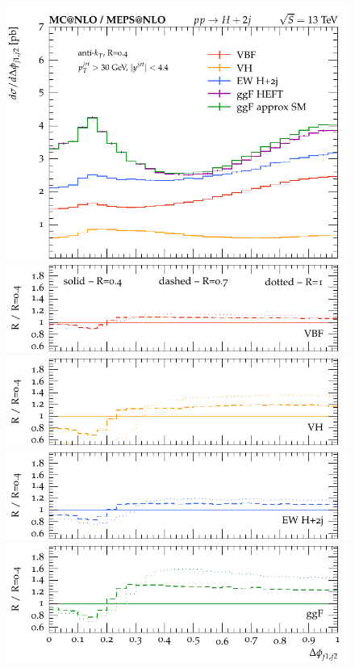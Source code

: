 \documentclass[10pt,prd,fleqn,superscriptaddress,notitlepage,nofootinbib,preprintnumbers,nobalancelastpage]{revtex4-1}
\begin{document}
\begin{figure}[p]
  \centering
  \begin{minipage}{.28\textwidth}
    \includegraphics[width=\textwidth]{figures/channels/delta_phi_jj12.pdf}
    \includegraphics[width=\textwidth]{figures/channels/delta_phi_jj12_rVBF.pdf}
    \includegraphics[width=\textwidth]{figures/channels/delta_phi_jj12_rVH.pdf}
    \includegraphics[width=\textwidth]{figures/channels/delta_phi_jj12_rHJJ.pdf}
    \includegraphics[width=\textwidth]{figures/channels/delta_phi_jj12_rGGH.pdf}

\end{minipage}
\end{figure}
\end{document}
